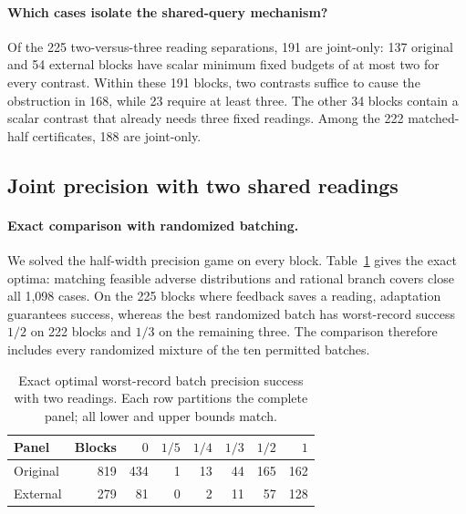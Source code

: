 \documentclass[12pt]{article}
\begin{document}
\paragraph{Which cases isolate the shared-query mechanism?}
Of the 225 two-versus-three reading separations, 191 are joint-only:
137 original and 54 external blocks have scalar minimum fixed budgets of at
most two for every contrast. Within these 191 blocks, two contrasts suffice
to cause the obstruction in 168, while 23 require at least three. The other
34 blocks contain a scalar contrast that already needs three fixed readings.
Among the 222 matched-half certificates, 188 are joint-only.


\subsection{Joint precision with two shared readings}\label{sec:joint-results}
\paragraph{Exact comparison with randomized batching.}
We solved the half-width precision game on every block.
Table~\ref{tab:joint_precision_status} gives the exact optima: matching
feasible adverse distributions and rational branch covers close all
1,098 cases. On the 225 blocks where feedback saves a reading, adaptation
guarantees success, whereas the best randomized batch has worst-record
success $1/2$ on 222 blocks and $1/3$ on the remaining three.
The comparison therefore includes every randomized mixture of the ten
permitted batches.

\begin{table}[htbp]\centering\small
\caption{Exact optimal worst-record batch precision success with two readings.
Each row partitions the complete panel; all lower and upper bounds match.}
\label{tab:joint_precision_status}
\begin{tabular}{lrrrrrrr}\toprule
Panel & Blocks & $0$ & $1/5$ & $1/4$ & $1/3$ & $1/2$ & $1$\\\midrule
Original & 819 & 434 & 1 & 13 & 44 & 165 & 162\\
External & 279 & 81 & 0 & 2 & 11 & 57 & 128\\\bottomrule
\end{tabular}\end{table}
\end{document}
